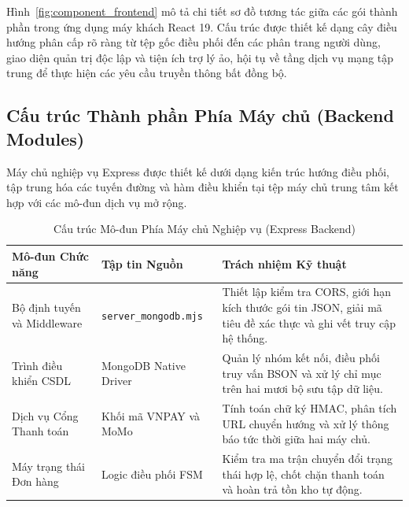 Hình~\ref{fig:component_frontend} mô tả chi tiết sơ đồ tương tác giữa các gói thành phần trong ứng dụng máy khách React 19. Cấu trúc được thiết kế dạng cây điều hướng phân cấp rõ ràng từ tệp gốc điều phối đến các phân trang người dùng, giao diện quản trị độc lập và tiện ích trợ lý ảo, hội tụ về tầng dịch vụ mạng tập trung để thực hiện các yêu cầu truyền thông bất đồng bộ.

\subsection{Cấu trúc Thành phần Phía Máy chủ (Backend Modules)}
Máy chủ nghiệp vụ Express được thiết kế dưới dạng kiến trúc hướng điều phối, tập trung hóa các tuyến đường và hàm điều khiển tại tệp máy chủ trung tâm kết hợp với các mô-đun dịch vụ mở rộng.

\begin{table}[H]
\centering
\caption{Cấu trúc Mô-đun Phía Máy chủ Nghiệp vụ (Express Backend)}
\label{tab:backend_modules}
\begin{tabularx}{\textwidth}{p{3.5cm}p{3.2cm}X}
\toprule
\textbf{Mô-đun Chức năng} & \textbf{Tập tin Nguồn} & \textbf{Trách nhiệm Kỹ thuật} \\
\midrule
Bộ định tuyến và Middleware & \texttt{server\_mongodb.mjs} & Thiết lập kiểm tra CORS, giới hạn kích thước gói tin JSON, giải mã tiêu đề xác thực và ghi vết truy cập hệ thống. \\
\addlinespace
Trình điều khiển CSDL & MongoDB Native Driver & Quản lý nhóm kết nối, điều phối truy vấn BSON và xử lý chỉ mục trên hai mươi bộ sưu tập dữ liệu. \\
\addlinespace
Dịch vụ Cổng Thanh toán & Khối mã VNPAY và MoMo & Tính toán chữ ký HMAC, phân tích URL chuyển hướng và xử lý thông báo tức thời giữa hai máy chủ. \\
\addlinespace
Máy trạng thái Đơn hàng & Logic điều phối FSM & Kiểm tra ma trận chuyển đổi trạng thái hợp lệ, chốt chặn thanh toán và hoàn trả tồn kho tự động. \\
\bottomrule
\end{tabularx}
\end{table}

